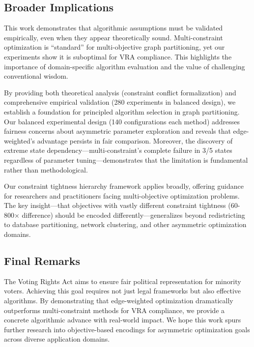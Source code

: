 \subsection{Broader Implications}

This work demonstrates that algorithmic assumptions must be validated empirically, even when they appear theoretically sound. Multi-constraint optimization is ``standard'' for multi-objective graph partitioning, yet our experiments show it is suboptimal for VRA compliance. This highlights the importance of domain-specific algorithm evaluation and the value of challenging conventional wisdom.

By providing both theoretical analysis (constraint conflict formalization) and comprehensive empirical validation (280 experiments in balanced design), we establish a foundation for principled algorithm selection in graph partitioning. Our balanced experimental design (140 configurations each method) addresses fairness concerns about asymmetric parameter exploration and reveals that edge-weighted's advantage persists in fair comparison. Moreover, the discovery of extreme state dependency---multi-constraint's complete failure in 3/5 states regardless of parameter tuning---demonstrates that the limitation is fundamental rather than methodological.

Our constraint tightness hierarchy framework applies broadly, offering guidance for researchers and practitioners facing multi-objective optimization problems. The key insight---that objectives with vastly different constraint tightness (60-800× difference) should be encoded differently---generalizes beyond redistricting to database partitioning, network clustering, and other asymmetric optimization domains.

\subsection{Final Remarks}

The Voting Rights Act aims to ensure fair political representation for minority voters. Achieving this goal requires not just legal frameworks but also effective algorithms. By demonstrating that edge-weighted optimization dramatically outperforms multi-constraint methods for VRA compliance, we provide a concrete algorithmic advance with real-world impact. We hope this work spurs further research into objective-based encodings for asymmetric optimization goals across diverse application domains.
